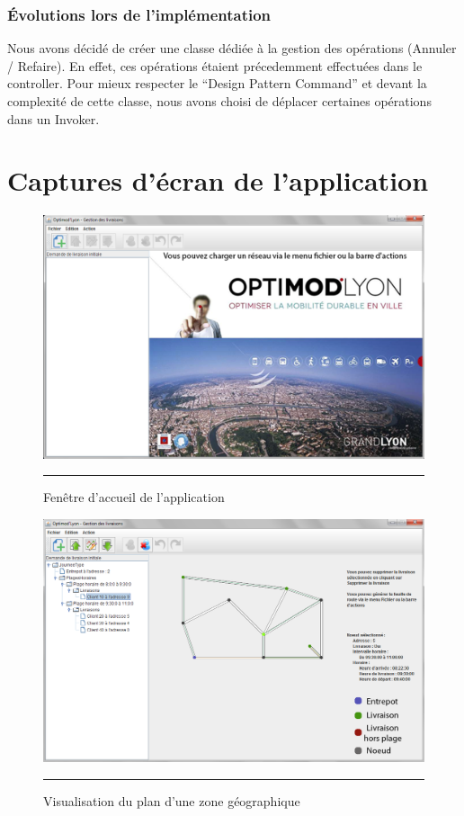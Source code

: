 \subsubsection{Évolutions lors de l'implémentation}
Nous avons décidé de créer une classe dédiée à la gestion des opérations (Annuler / Refaire). En effet, ces opérations étaient précedemment effectuées dans le controller. Pour mieux respecter le “Design Pattern Command” et devant la complexité de cette classe, nous avons choisi de déplacer certaines opérations dans un Invoker.



\section{Captures d'écran de l'application}
\begin{figure}[H]
	\centering
		\includegraphics[width=\textwidth,height=\textheight,keepaspectratio]{Figures/welcome}
		\rule{35em}{0.5pt}
	\caption[Fenêtre d'accueil de l'application]{Fenêtre d'accueil de l'application}
\end{figure}
\begin{figure}[H]
	\centering
		\includegraphics[width=\textwidth,height=\textheight,keepaspectratio]{Figures/plan}
		\rule{35em}{0.5pt}
	\caption[Visualisation du plan d'une zone géographique]{Visualisation du plan d'une zone géographique}
\end{figure}
